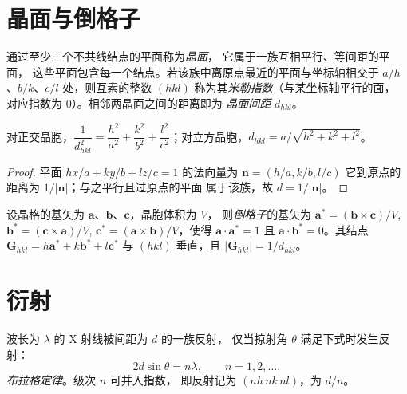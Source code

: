 \section{晶面与倒格子}

\begin{definition}\label{def:b3:x-ray-diffraction:miller}
通过至少三个不共线结点的平面称为\emph{晶面}，
它属于一族互相平行、等间距的平面，
这些平面包含每一个结点。若该族中离原点最近的平面与坐标轴相交于
$a/h$、$b/k$、$c/l$ 处，则互素的整数 $(hkl)$
称为其\emph{米勒指数}（与某坐标轴平行的面，
对应指数为 0）。相邻两晶面之间的距离即为
\emph{晶面间距} $d_{hkl}$。
\end{definition}

\begin{proposition}[正交晶胞中的间距]\label{prop:b3:x-ray-diffraction:spacing}
对正交晶胞，$\dfrac{1}{d_{hkl}^2} = \dfrac{h^2}{a^2} + \dfrac{k^2}{b^2} +
\dfrac{l^2}{c^2}$；对立方晶胞，$d_{hkl} = a/\sqrt{h^2 + k^2 + l^2}$。
\end{proposition}

\begin{proof}
平面 $hx/a + ky/b + lz/c = 1$ 的法向量为 $\mathbf n = (h/a, k/b, l/c)$
它到原点的距离为 $1/|\mathbf n|$；与之平行且过原点的平面
属于该族，故 $d = 1/|\mathbf n|$。
\end{proof}

\begin{definition}[倒格子]\label{def:b3:x-ray-diffraction:reciprocal}
设晶格的基矢为 $\mathbf a$、$\mathbf b$、$\mathbf c$，晶胞体积为 $V$，
则\emph{倒格子}的基矢为
$\mathbf a^* = (\mathbf b\times\mathbf c)/V$, $\mathbf b^* = (\mathbf c\times\mathbf a)/V$,
$\mathbf c^* = (\mathbf a\times\mathbf b)/V$，使得 $\mathbf a\cdot\mathbf a^* = 1$ 且
$\mathbf a\cdot\mathbf b^* = 0$。其结点 $\mathbf G_{hkl} = h\mathbf a^* + k\mathbf b^* + l\mathbf c^*$
与 $(hkl)$ 垂直，且 $|\mathbf G_{hkl}| = 1/d_{hkl}$。
\end{definition}

\section{衍射}

\begin{theorem}[布拉格定律]\label{thm:b3:x-ray-diffraction:bragg}
波长为 $\lambda$ 的 X 射线被间距为 $d$ 的一族反射，
仅当掠射角 $\theta$ 满足下式时发生反射：
\[
2d\sin\theta = n\lambda, \qquad n = 1, 2, \dots,
\]
\emph{布拉格定律}。级次 $n$ 可并入指数，
即反射记为 $(nh\,nk\,nl)$，为 $d/n$。
\end{theorem}


